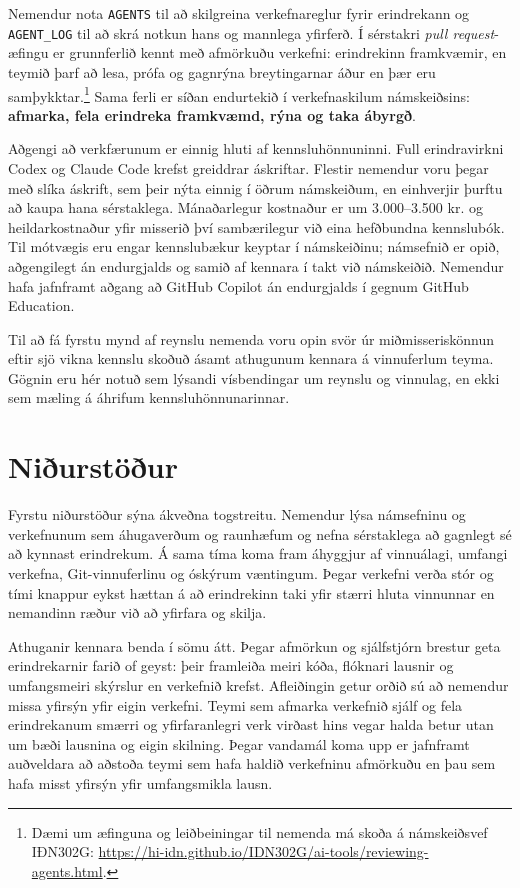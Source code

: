 \documentclass{kennsluakademia_conf}
\begin{document}
\begin{samepage}

Nemendur nota \texttt{AGENTS} til að skilgreina verkefnareglur fyrir
erindrekann og \texttt{AGENT\_LOG} til að skrá notkun hans og mannlega
yfirferð. Í sérstakri \emph{pull request}-æfingu er grunnferlið kennt
með afmörkuðu verkefni: erindrekinn framkvæmir, en teymið þarf að lesa,
prófa og gagnrýna breytingarnar áður en þær eru samþykktar.\footnote{Dæmi
  um æfinguna og leiðbeiningar til nemenda má skoða á námskeiðsvef
  IÐN302G:
  \url{https://hi-idn.github.io/IDN302G/ai-tools/reviewing-agents.html}.}
Sama ferli er síðan endurtekið í verkefnaskilum námskeiðsins:
\textbf{afmarka, fela erindreka framkvæmd, rýna og taka ábyrgð}.

\end{samepage}

Aðgengi að verkfærunum er einnig hluti af kennsluhönnuninni. Full
erindravirkni Codex og Claude Code krefst greiddrar áskriftar. Flestir
nemendur voru þegar með slíka áskrift, sem þeir nýta einnig í öðrum
námskeiðum, en einhverjir þurftu að kaupa hana sérstaklega. Mánaðarlegur
kostnaður er um 3.000--3.500 kr. og heildarkostnaður yfir misserið því
sambærilegur við eina hefðbundna kennslubók. Til mótvægis eru engar
kennslubækur keyptar í námskeiðinu; námsefnið er opið, aðgengilegt án
endurgjalds og samið af kennara í takt við námskeiðið. Nemendur hafa
jafnframt aðgang að GitHub Copilot án endurgjalds í gegnum GitHub
Education.

Til að fá fyrstu mynd af reynslu nemenda voru opin svör úr
miðmisseriskönnun eftir sjö vikna kennslu skoðuð ásamt athugunum kennara
á vinnuferlum teyma. Gögnin eru hér notuð sem lýsandi vísbendingar um
reynslu og vinnulag, en ekki sem mæling á áhrifum kennsluhönnunarinnar.

\section{Niðurstöður}\label{niuxf0urstuxf6uxf0ur}

Fyrstu niðurstöður sýna ákveðna togstreitu. Nemendur lýsa námsefninu og
verkefnunum sem áhugaverðum og raunhæfum og nefna sérstaklega að
gagnlegt sé að kynnast erindrekum. Á sama tíma koma fram áhyggjur af
vinnuálagi, umfangi verkefna, Git-vinnuferlinu og óskýrum væntingum.
Þegar verkefni verða stór og tími knappur eykst hættan á að erindrekinn
taki yfir stærri hluta vinnunnar en nemandinn ræður við að yfirfara og
skilja.

Athuganir kennara benda í sömu átt. Þegar afmörkun og sjálfstjórn
brestur geta erindrekarnir farið of geyst: þeir framleiða meiri kóða,
flóknari lausnir og umfangsmeiri skýrslur en verkefnið krefst.
Afleiðingin getur orðið sú að nemendur missa yfirsýn yfir eigin
verkefni. Teymi sem afmarka verkefnið sjálf og fela erindrekanum smærri
og yfirfaranlegri verk virðast hins vegar halda betur utan um bæði
lausnina og eigin skilning. Þegar vandamál koma upp er jafnframt
auðveldara að aðstoða teymi sem hafa haldið verkefninu afmörkuðu en þau
sem hafa misst yfirsýn yfir umfangsmikla lausn.
\end{document}
